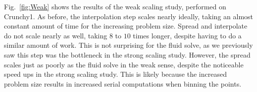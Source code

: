 \documentclass[]{article}
\begin{document}
Fig.\ \ref{fig:Weak} shows the results of the weak scaling study, performed on Crunchy1. As before, the interpolation step scales nearly ideally, taking an almost constant amount of time for the increasing problem size. Spread and interpolate do not scale nearly as well, taking $8$ to $10$ times longer, despite having to do a similar amount of work. This is not surprising for the fluid solve, as we previously saw this step was the bottleneck in the strong scaling study. However, the spread scales just as poorly as the fluid solve in the weak sense, despite the noticeable speed ups in the strong scaling study. This is likely because the increased problem size results in increased serial computations when binning the points. 






\newpage



\end{document}
